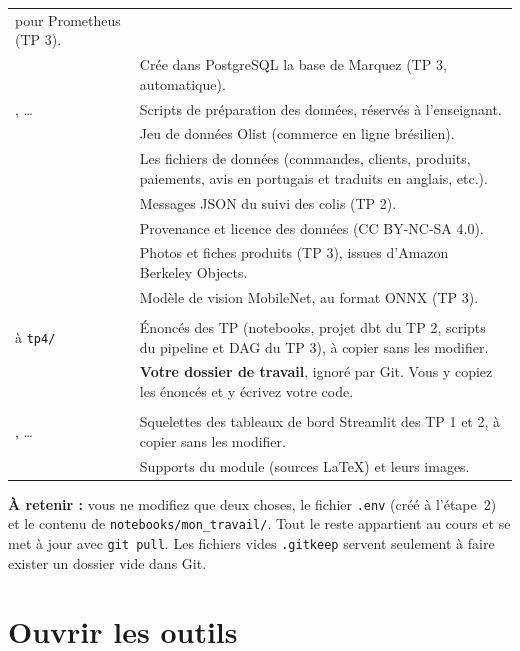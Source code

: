 \documentclass[11pt,a4paper]{article}
\newcommand{\cmd}[1]{\texttt{#1}}
\begin{document}
{\begin{xltabular}{\textwidth}{@{}>{\raggedright\arraybackslash}p{5.6cm} >{\raggedright\arraybackslash}X@{}}
  pour Prometheus (TP 3). \\
 & Crée dans PostgreSQL la base de Marquez (TP 3, automatique). \\
, \dots & Scripts de préparation des données, réservés à l'enseignant. \\
\addlinespace
{} & Jeu de données Olist (commerce en ligne brésilien). \\*
 & Les fichiers de données (commandes, clients, produits, paiements, avis en
  portugais et traduits en anglais, etc.). \\
 & Messages JSON du suivi des colis (TP 2). \\
 & Provenance et licence des données (CC BY-NC-SA 4.0). \\
\addlinespace
{} & Photos et fiches produits (TP 3), issues d'Amazon Berkeley Objects. \\
 & Modèle de vision MobileNet, au format ONNX (TP 3). \\
\addlinespace
{} & \\*
 à \texttt{tp4/} & Énoncés des TP (notebooks, projet dbt du TP 2, scripts
  du pipeline et DAG du TP 3), à copier sans les modifier. \\
 & \textbf{Votre dossier de travail}, ignoré par Git. Vous y copiez
  les énoncés et y écrivez votre code. \\
\addlinespace
{} & \\*
, \dots & Squelettes des tableaux de bord Streamlit des TP 1 et 2, à copier sans les modifier. \\
\addlinespace
{} & Supports du module (sources \LaTeX{}) et leurs images. \\*
\end{xltabular}
}

\textbf{À retenir :} vous ne modifiez que deux choses, le fichier \cmd{.env} (créé à l'étape~2)
et le contenu de \cmd{notebooks/mon\_travail/}. Tout le reste appartient au cours et se met à jour
avec \cmd{git pull}. Les fichiers vides \cmd{.gitkeep} servent seulement à faire exister un dossier
vide dans Git.

\section{Ouvrir les outils}
\end{document}
